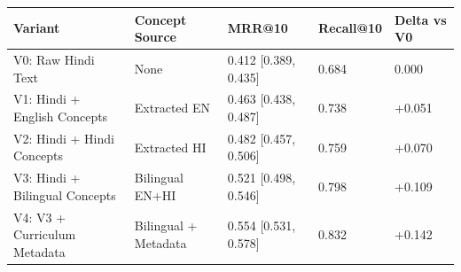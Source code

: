 \begin{tabular}{lllll}
\toprule
Variant & Concept Source & MRR@10 & Recall@10 & Delta vs V0 \\
\midrule
V0: Raw Hindi Text & None & 0.412 [0.389, 0.435] & 0.684 & 0.000 \\
V1: Hindi + English Concepts & Extracted EN & 0.463 [0.438, 0.487] & 0.738 & +0.051 \\
V2: Hindi + Hindi Concepts & Extracted HI & 0.482 [0.457, 0.506] & 0.759 & +0.070 \\
V3: Hindi + Bilingual Concepts & Bilingual EN+HI & 0.521 [0.498, 0.546] & 0.798 & +0.109 \\
V4: V3 + Curriculum Metadata & Bilingual + Metadata & 0.554 [0.531, 0.578] & 0.832 & +0.142 \\
\bottomrule
\end{tabular}

